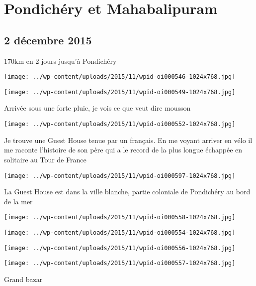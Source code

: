 \chapter{Pondichéry et Mahabalipuram}
\section*{2 décembre 2015}
170km en 2 jours jusqu'à Pondichéry \newline
 \newline
\centerline{\texttt{[image: ../wp-content/uploads/2015/11/wpid-oi000546-1024x768.jpg]} } 
 \newline
 \newline
\centerline{\texttt{[image: ../wp-content/uploads/2015/11/wpid-oi000549-1024x768.jpg]} } 
 \newline
 Arrivée sous une forte pluie, je vois ce que veut dire mousson \newline
 \newline
\centerline{\texttt{[image: ../wp-content/uploads/2015/11/wpid-oi000552-1024x768.jpg]} } 
 \newline
 Je trouve une Guest House tenue par un français. En me voyant arriver en vélo il me raconte l'histoire de son père qui a le record de la plus longue échappée en solitaire au Tour de France \newline
 \newline
\centerline{\texttt{[image: ../wp-content/uploads/2015/11/wpid-oi000597-1024x768.jpg]} } 
 \newline
 La Guest House est dans la ville blanche, partie coloniale de Pondichéry au bord de la mer \newline
 \newline
\centerline{\texttt{[image: ../wp-content/uploads/2015/11/wpid-oi000558-1024x768.jpg]} } 
 \newline
 \newline
\centerline{\texttt{[image: ../wp-content/uploads/2015/11/wpid-oi000554-1024x768.jpg]} } 
 \newline
 \newline
\centerline{\texttt{[image: ../wp-content/uploads/2015/11/wpid-oi000556-1024x768.jpg]} } 
 \newline
 \newline
\centerline{\texttt{[image: ../wp-content/uploads/2015/11/wpid-oi000557-1024x768.jpg]} } 
 \newline
 Grand bazar \newline
